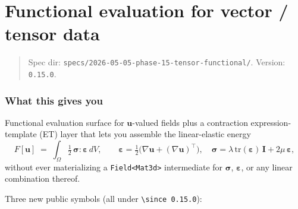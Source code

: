 \chapter{Functional evaluation for vector / tensor data}
\label{chap:tensor-functional}

\begin{quote}
Spec dir:
\passthrough{\lstinline!specs/2026-05-05-phase-15-tensor-functional/!}.
Version: \passthrough{\lstinline!0.15.0!}.
\end{quote}

\subsection{What this gives you}\label{phase15-what}

Functional evaluation surface for \(\mathbf{u}\)-valued fields plus a
contraction expression-template (ET) layer that lets you assemble the
linear-elastic energy
\[
F[\mathbf u] \;=\; \int_\Omega \tfrac{1}{2}\,\boldsymbol{\sigma}:\boldsymbol{\varepsilon}\,dV,
\qquad
\boldsymbol{\varepsilon} = \tfrac12\!\big(\nabla\mathbf u + (\nabla\mathbf u)^\top\big),
\quad
\boldsymbol{\sigma} = \lambda\,\mathrm{tr}(\boldsymbol{\varepsilon})\,\mathbf{I}
                       + 2\mu\,\boldsymbol{\varepsilon},
\]
without ever materializing a \passthrough{\lstinline!Field<Mat3d>!}
intermediate for \(\boldsymbol{\sigma}\), \(\boldsymbol{\varepsilon}\),
or any linear combination thereof.

Three new public symbols (all under \passthrough{\lstinline!\\since 0.15.0!}):

